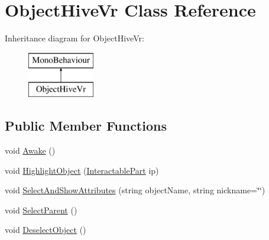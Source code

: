 \hypertarget{class_object_hive_vr}{}\section{Object\+Hive\+Vr Class Reference}
\label{class_object_hive_vr}
Inheritance diagram for Object\+Hive\+Vr\+:\begin{figure}[H]
\begin{center}
\leavevmode
\includegraphics[height=2.000000cm]{class_object_hive_vr}
\end{center}
\end{figure}
\subsection*{Public Member Functions}
\begin{DoxyCompactItemize}
\item 
void \mbox{\hyperlink{class_object_hive_vr_a85e943150fb8b266ab15d42149caa456}{Awake}} ()
\item 
void \mbox{\hyperlink{class_object_hive_vr_a411f1acf0f2047c8248ccf1662999f21}{Highlight\+Object}} (\mbox{\hyperlink{class_interactable_part}{Interactable\+Part}} ip)
\item 
void \mbox{\hyperlink{class_object_hive_vr_a5b7d838d57f778ac91cc0e666709512f}{Select\+And\+Show\+Attributes}} (string object\+Name, string nickname=\char`\"{}\char`\"{})
\item 
void \mbox{\hyperlink{class_object_hive_vr_aae31b142421654bbc931d81ff784bfad}{Select\+Parent}} ()
\item 
void \mbox{\hyperlink{class_object_hive_vr_ac02837d7593b8950ea1fd00949630301}{Deselect\+Object}} ()
\end{DoxyCompactItemize}

